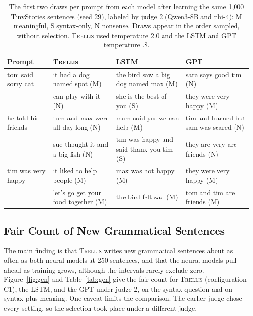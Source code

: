 \documentclass[11pt,letterpaper]{article}
\newcommand{\trellis}{\textsc{Trellis}}
\begin{document}
\begin{table}[!htbp]
\caption{The first two draws per prompt from each model after learning the same 1,000 TinyStories sentences (seed 29), labeled by judge 2 (Qwen3-8B and phi-4): M meaningful, S syntax-only, N nonsense.
Draws appear in the order sampled, without selection. \trellis{} used temperature 2.0 and the LSTM and GPT temperature .8.}
\label{tab:samples}
\begin{center}
\small
\begin{tabular}{p{}p{}p{}p{}}
\toprule
Prompt & \trellis{} & LSTM & GPT \\
\midrule
tom said sorry cat & it had a dog named spot (M) & the bird saw a big dog named max (M) & sara says good tim (N) \\
 & can play with it (N) & she is the best of you (S) & they were very happy (M) \\
he told his friends & tom and max were all day long (N) & mom said yes we can help (M) & tim and learned but sam was scared (N) \\
 & sue thought it and a big fish (N) & tim was happy and said thank you tim (S) & they are very are friends (N) \\
tim was very happy & it liked to help people (M) & max was not happy (M) & they were very happy (M) \\
 & let's go get your food together (M) & the bird felt sad (M) & tom and tim are friends (M) \\
\bottomrule
\end{tabular}
\end{center}
\end{table}

\subsection{Fair Count of New Grammatical Sentences}

The main finding is that \trellis{} writes new grammatical sentences about as often as both neural models at 250 sentences, and that the neural models pull ahead as training grows, although the intervals rarely exclude zero.
Figure~\ref{fig:gen} and Table~\ref{tab:gen} give the fair count for \trellis{} (configuration C1), the LSTM, and the GPT under judge 2, on the syntax question and on syntax plus meaning.
One caveat limits the comparison. The earlier judge chose every setting, so the selection took place under a different judge.
\end{document}
